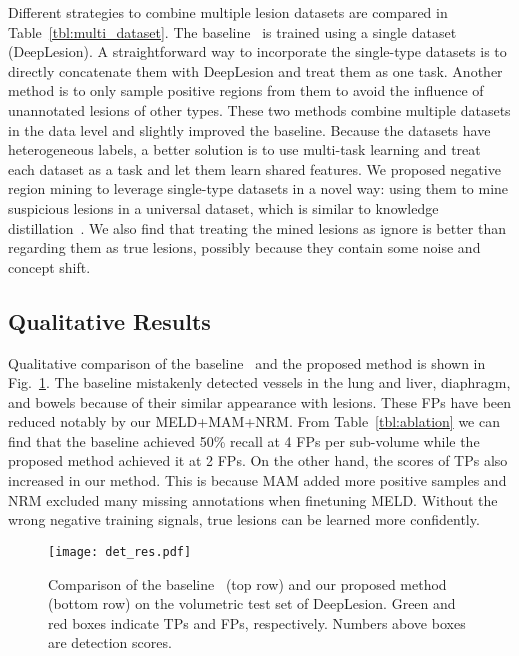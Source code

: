 \documentclass[runningheads]{llncs}
\def\Fig#1{{Fig.~\ref{fig:#1}}}
\def\Table#1{{Table~\ref{tbl:#1}}}
\begin{document}
Different strategies to combine multiple lesion datasets are compared in \Table{multi_dataset}. The baseline~\cite{Yan2019MULAN} is trained using a single dataset (DeepLesion). A straightforward way to incorporate the single-type datasets is to directly concatenate them with DeepLesion and treat them as one task. Another method is to only sample positive regions from them to avoid the influence of unannotated lesions of other types. These two methods combine multiple datasets in the data level and slightly improved the baseline. Because the datasets have heterogeneous labels, a better solution is to use multi-task learning and treat each dataset as a task and let them learn shared features. We proposed negative region mining to leverage single-type datasets in a novel way: using them to mine suspicious lesions in a universal dataset, which is similar to knowledge distillation~\cite{Hinton2014distill}. We also find that treating the mined lesions as ignore is better than regarding them as true lesions, possibly because they contain some noise and concept shift.

\subsection{Qualitative Results}
\label{subsec:qualitative}

Qualitative comparison of the baseline~\cite{Yan2019MULAN} and the proposed method is shown in \Fig{det_res}. The baseline mistakenly detected vessels in the lung and liver, diaphragm, and bowels because of their similar appearance with lesions. These FPs have been reduced notably by our MELD+MAM+NRM. From \Table{ablation} we can find that the baseline achieved 50\% recall at 4 FPs per sub-volume while the proposed method achieved it at 2 FPs. On the other hand, the scores of TPs also increased in our method. This is because MAM added more positive samples and NRM excluded many missing annotations when finetuning MELD. Without the wrong negative training signals, true lesions can be learned more confidently.  

\begin{figure}[t]
	\centering
	\texttt{[image: det\_res.pdf]} \caption{Comparison of the baseline~\cite{Yan2019MULAN} (top row) and our proposed method (bottom row) on the volumetric test set of DeepLesion. Green and red boxes indicate TPs and FPs, respectively. Numbers above boxes are detection scores.}
	\label{fig:det_res} \vspace{-3mm}
\end{figure}
\end{document}
